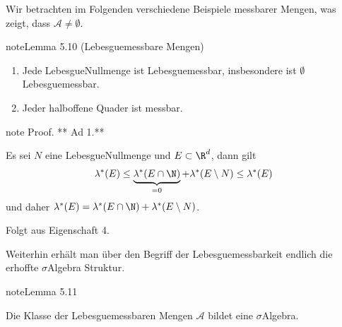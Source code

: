 \documentclass[letterpaper,10pt,german]{jupyterBook}
\begin{document}
\sphinxAtStartPar
Wir betrachten im Folgenden verschiedene Beispiele messbarer Mengen, was zeigt, dass \(\mathcal{A}\neq \emptyset\).
\label{masstheorie/masstheorie:thm:lebesguemes}
\begin{sphinxadmonition}{note}{Lemma 5.10 (Lebesgue\sphinxhyphen{}messbare Mengen)}


\begin{enumerate}
%
\item {} 
\sphinxAtStartPar
Jede Lebesgue\sphinxhyphen{}Nullmenge ist Lebesgue\sphinxhyphen{}messbar, insbesondere ist \(\emptyset\) Lebesgue\sphinxhyphen{}messbar.

\item {} 
\sphinxAtStartPar
Jeder halboffene Quader ist messbar.

\end{enumerate}
\end{sphinxadmonition}

\begin{sphinxadmonition}{note}
\sphinxAtStartPar
Proof. ** Ad 1.**

\sphinxAtStartPar
Es sei \(N\) eine Lebesgue\sphinxhyphen{}Nullmenge und \(E\subset\R^d\), dann gilt
\begin{equation*}
\begin{split}\lambda^\ast(E) \leq \underbrace{\lambda^\ast(E\cap\N)}_{=0} + \lambda^\ast(E\setminus N)\leq
 \lambda^\ast(E)\end{split}
\end{equation*}
\sphinxAtStartPar
und daher \(\lambda^\ast(E) = \lambda^\ast(E\cap\N) + \lambda^\ast(E\setminus N)\).

\sphinxAtStartPar
{}

\sphinxAtStartPar
Folgt aus {\hyperref[\detokenize{masstheorie/masstheorie:thm:outerlebesgue}]{}} Eigenschaft 4.
\end{sphinxadmonition}

\sphinxAtStartPar
Weiterhin erhält man über den Begriff der Lebesgue\sphinxhyphen{}messbarkeit endlich die erhoffte \(\sigma\)\sphinxhyphen{}Algebra Struktur.
\label{masstheorie/masstheorie:lemma-40}
\begin{sphinxadmonition}{note}{Lemma 5.11}



\sphinxAtStartPar
Die Klasse der Lebesgue\sphinxhyphen{}messbaren Mengen \(\mathcal{A}\) bildet eine \(\sigma\)\sphinxhyphen{}Algebra.
\end{sphinxadmonition}
\end{document}
